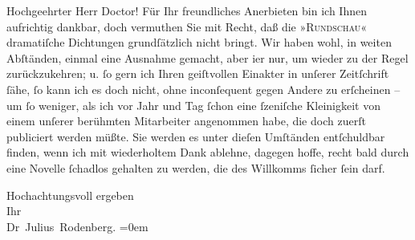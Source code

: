 \pstart{}Hochgeehrter Herr Doctor!\pend\vspace{0.5em}
\pstart
           Für Ihr freundliches Anerbieten bin ich Ihnen aufrichtig dankbar, doch vermuthen Sie
               mit Recht, daß die »\textsc{Rundschau}« dramatiſche Dichtungen grundſätzlich nicht bringt. Wir haben wohl, in weiten
               Abſtänden, einmal eine Ausnahme gemacht, aber i{\geminationm}er nur,
               um wieder zu der Regel zurückzukehren; u.{ }ſo gern ich Ihren geiſtvollen Einakter in unſerer Zeitſchrift{ }ſähe,{ }ſo kann ich es doch nicht, ohne inconſequent gegen Andere zu erſcheinen – um{ }ſo
               weniger, als ich vor Jahr und Tag{ }ſchon eine{ }ſzeniſche Kleinigkeit von einem unſerer
               berühmten Mitarbeiter angenommen habe, die doch zuerſt publiciert werden müßte. Sie
               werden es unter dieſen Umſtänden entſchuldbar finden, wenn ich mit wiederholtem Dank
               ablehne, dagegen hoffe, recht bald durch eine Novelle{ }ſchadlos gehalten zu werden,
               die des Willkomms{ }ſicher{ }ſein darf.\pend
           
\pstart
           Hochachtungsvoll ergeben{\\[\baselineskip]}Ihr{\\[\baselineskip]}\spacefill\mbox{Dr Julius Rodenberg.}\pend
           \leftskip=0em{}\endnumbering{}  \newcommand{\dateiname}{L00904}\newcommand{\titel}{Julius Rodenberg an Arthur Schnitzler, 9. 3. 1899}\newcommand{\editorInnen}{Martin Anton Müller und Gerd-Hermann Susen}
